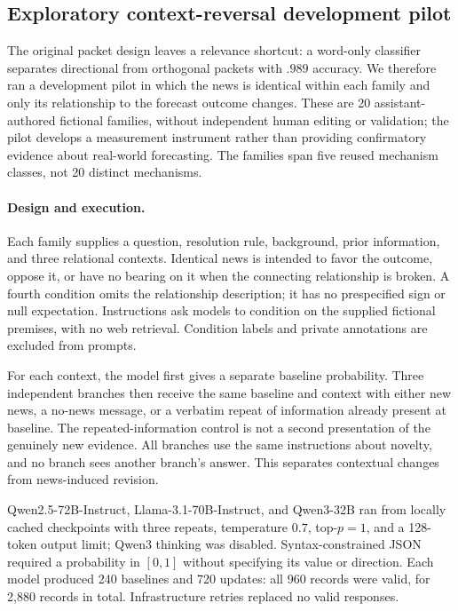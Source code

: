 \subsection{Exploratory context-reversal development pilot}
\label{app:exp1-context-reversal}

The original packet design leaves a relevance shortcut: a word-only classifier
separates directional from orthogonal packets with $.989$ accuracy. We therefore
ran a development pilot in which the news is identical within each family and
only its relationship to the forecast outcome changes. These are 20
assistant-authored fictional families, without independent human editing or
validation; the pilot develops a measurement instrument rather than providing
confirmatory evidence about real-world forecasting. The families span five reused
mechanism classes, not 20 distinct mechanisms.

\paragraph{Design and execution.}
Each family supplies a question, resolution rule, background, prior information,
and three relational contexts. Identical news is intended to favor the outcome,
oppose it, or have no bearing on it when the connecting relationship is broken.
A fourth condition omits the relationship description; it has no prespecified
sign or null expectation. Instructions ask models to condition on the supplied
fictional premises, with no web retrieval. Condition labels and private
annotations are excluded from prompts.

For each context, the model first gives a separate baseline probability. Three
independent branches then receive the same baseline and context with either
new news, a no-news message, or a verbatim repeat of information already present
at baseline. The repeated-information control is not a second presentation of
the genuinely new evidence. All branches use the same instructions about novelty,
and no branch sees another branch's answer. This separates contextual changes
from news-induced revision.

Qwen2.5-72B-Instruct, Llama-3.1-70B-Instruct, and Qwen3-32B ran from locally cached
checkpoints with three repeats, temperature $0.7$, top-$p=1$, and a 128-token
output limit; Qwen3 thinking was disabled. Syntax-constrained JSON required a
probability in $[0,1]$ without specifying its value or direction. Each model
produced 240 baselines and 720 updates: all 960 records were valid, for 2,880
records in total. Infrastructure retries replaced no valid responses.

